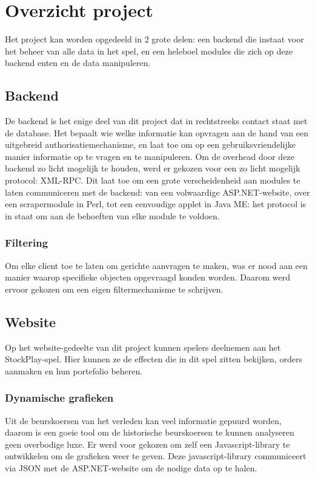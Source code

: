 \chapter{Overzicht project}
Het project kan worden opgedeeld in 2 grote delen: een backend die instaat voor het beheer van alle data in het spel, en een heleboel modules die zich op deze backend enten en de data manipuleren.

\section{Backend}
De backend is het enige deel van dit project dat in rechtstreeks contact staat met de database. Het bepaalt wie welke informatie kan opvragen aan de hand van een uitgebreid authorisatiemechanisme, en laat toe om op een gebruiksvriendelijke manier informatie op te vragen en te manipuleren.
Om de overhead door deze backend zo licht mogelijk te houden, werd er gekozen voor een zo licht mogelijk protocol: XML-RPC. Dit laat toe om een grote verscheidenheid aan modules te laten communiceren met de backend: van een volwaardige ASP.NET-website, over een scrapermodule in Perl, tot een eenvoudige applet in Java ME: het protocol is in staat om aan de behoeften van elke module te voldoen.
\subsection{Filtering}
Om elke client toe te laten om gerichte aanvragen te maken, was er nood aan een manier waarop specifieke objecten opgevraagd konden worden. Daarom werd ervoor gekozen om een eigen filtermechanisme te schrijven.

\section{Website}
Op het website-gedeelte van dit project kunnen spelers deelnemen aan het StockPlay-spel. Hier kunnen ze de effecten die in dit spel zitten bekijken, orders aanmaken en hun portefolio beheren.
\subsection{Dynamische grafieken}
Uit de beurskoersen van het verleden kan veel informatie gepuurd worden, daarom is een goeie tool om de historische beurskoersen te kunnen analyseren geen overbodige luxe. Er werd voor gekozen om zelf een Javascript-library te ontwikkelen om de grafieken weer te geven. Deze javascript-library communiceert via JSON met de ASP.NET-website om de nodige data op te halen.

